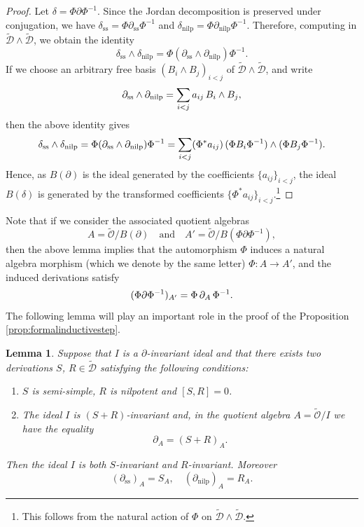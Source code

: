 \documentclass[10pt,twoside,reqno]{amsart}
\newtheorem{lemma}[thm]{Lemma}
\theoremstyle{remark}
\theoremstyle{remark}
\newcommand{\DD}{\mathcal{D}}
\newcommand{\tmop}[1]{{\operatorname{#1}}}
\newenvironment{enumeratealpha}{\begin{enumerate}[a{\textup{)}}] }{\end{enumerate}}
\newcommand{\tO}{\widetilde{\mathcal{O}}}
\newcommand{\cD}{\mathcal{D}}
\newcommand{\tcD}{\widetilde{\cD}}
\begin{document}
  \begin{proof}
      
  Let $\delta = \Phi \partial \Phi^{- 1}$. Since the Jordan
  decomposition is preserved under conjugation, we have
 $\delta_{\tmop{ss}} = \Phi \partial_{\tmop{ss}} \Phi^{- 1}$ and $\delta_{\tmop{nilp}}=
     \Phi \partial_{\tmop{nilp}} \Phi^{- 1}$. Therefore, computing in $ \widetilde{\DD} \wedge \widetilde{\DD}$, we obtain the identity
\[\delta_{\tmop{ss}} \wedge
     \delta_{\tmop{nilp}} = \Phi (\partial_{\tmop{ss}} \wedge
     \partial_{\tmop{nilp}}) \Phi^{- 1} . \]
  If we choose an arbitrary free basis $(B_i \wedge B_j)_{i < j}$ of $\widetilde{\DD}
  \wedge \widetilde{\DD}$, and write
  \[ \partial_{\tmop{ss}} \wedge \partial_{\tmop{nilp}} = \sum_{i < j} a_{ij} 
     \hspace{0.17em} B_i \wedge B_j, \]
  then the above identity gives
  \[ \delta_{\tmop{ss}} \wedge \delta_{\tmop{nilp}} = \Phi
     (\partial_{\tmop{ss}} \wedge \partial_{\tmop{nilp}}) \Phi^{- 1} = \sum_{i
     < j} (\Phi^{\ast} a_{ij})  \hspace{0.17em} (\Phi B_i \Phi^{- 1}) \wedge
     (\Phi B_j \Phi^{- 1}) . \]
  Hence, as $B (\partial)$ is the ideal generated by the coefficients
  $\{a_{ij} \}_{i < j}$, the ideal $B (\delta)$ is generated by the transformed
  coefficients $\{\Phi^{\ast} a_{ij} \}_{i < j}$.\footnote{This follows from
  the natural action of $\Phi$ on $\widetilde{\DD} \wedge \widetilde{\DD}$.}
\end{proof}
     Note that if we consider the associated quotient algebras
  \[ A = \widetilde{\mathcal{O}} / B (\partial)  \quad \text{and} \quad A' =
     \widetilde{\mathcal{O}} / B (\Phi \partial \Phi^{- 1}),  \]
  then the above lemma implies that the automorphism $\Phi$ induces a natural algebra morphism (which we denote by the same letter) $\Phi : A \to
  A'$, and the induced derivations satisfy
  \[ (\Phi \partial \Phi^{- 1})_{A'} = \Phi \hspace{0.17em} \partial_A 
     \hspace{0.17em} \Phi^{- 1} . \]
The following lemma will play an important role in the proof of the Proposition \ref{prop:formalinductivestep}. 
\begin{lemma}
  \label{Lemma-goestoquotient}Suppose that $I$ is a {$\partial$}-invariant
  ideal and that there exists two derivations $S$, $R \in \tcD$ satisfying the
  following conditions:
  \begin{enumeratealpha}
    \item $S$ is semi-simple, $R$ is nilpotent and $[S, R] = 0$.
    
    \item The ideal $I$ is $(S + R)$-invariant and, in the quotient algebra $A
    = \tO / I$ we have the equality
    \[ \partial_A = (S + R)_A. \]
  \end{enumeratealpha}
  Then the ideal $I$ is both $S$-invariant and $R$-invariant. Moreover
  \begin{equation}
    (\partial_{\tmop{ss}})_A = S_A, \quad (\partial_{\tmop{nilp}})_A = R_A.
    \label{condition-A}
  \end{equation}
\end{lemma}
\end{document}

